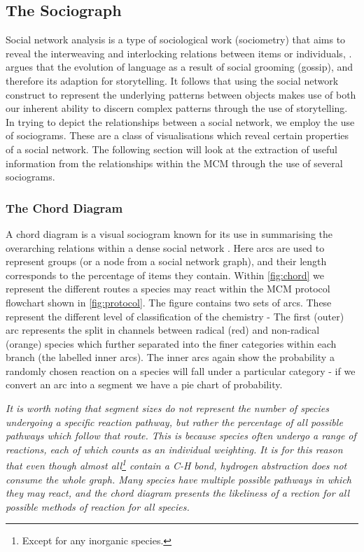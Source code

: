 \subsection{The Sociograph}\label{sec:sociographs}
Social network analysis is a type of sociological work (sociometry) that aims to reveal the interweaving and interlocking relations between items or individuals, \citep{socialorigin}. \citep{gossip} argues that the evolution of language as a result of social grooming (gossip), and therefore its adaption for storytelling. It follows that using the social network construct to represent the underlying patterns between objects makes use of both our inherent ability to discern complex patterns through the use of storytelling. In trying to depict the relationships between a social network, we employ the use of sociograms. These are a class of visualisations which reveal certain properties of a social network. The following section will look at the extraction of useful information from the relationships within the MCM through the use of several sociograms.

\subsubsection{The Chord Diagram}
A chord diagram is a visual sociogram known for its use in summarising the overarching relations within a dense social network \citep{chord}. Here arcs are used to represent groups (or a node from a social network graph), and their length corresponds to the percentage of items they contain. Within \autoref{fig:chord} we represent the different routes a species may react within the MCM protocol flowchart shown in \autoref{fig:protocol}. The figure contains two sets of arcs. These represent the different level of classification of the chemistry - The first (outer) arc represents the split in channels between radical (red) and non-radical (orange) species which further separated into the finer categories within each branch (the labelled inner arcs). The inner arcs again show the probability a randomly chosen reaction on a species will fall under a particular category - if we convert an arc into a segment we have a pie chart of probability.

\textit{It is worth noting that segment sizes do not represent the number of species undergoing a specific reaction pathway, but rather the percentage of all possible pathways which follow that route. This is because species often undergo a range of reactions, each of which counts as an individual weighting. It is for this reason that even though almost all\footnote{ Except for any inorganic species.} contain a C-H bond, hydrogen abstraction does not consume the whole graph. Many species have multiple possible pathways in which they may react, and the chord diagram presents the likeliness of a rection for all possible methods of reaction for all species.
}

